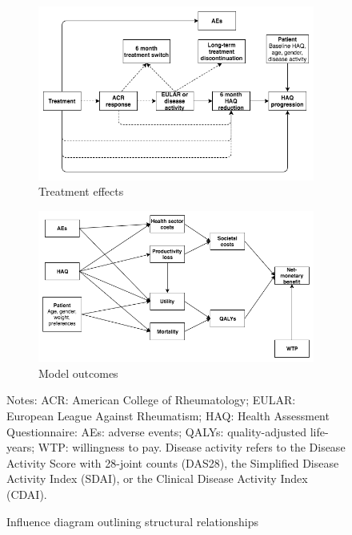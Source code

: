 \documentclass[11pt,final,fleqn]{article}\usepackage[]{graphicx}\usepackage[]{color}
\theoremstyle{plain}
\begin{document}
\begin{figure}
\centering
\begin{subfigure}{\textwidth}
\includegraphics[width=\textwidth]{influence-diagram-a.png}
\caption{Treatment effects} \label{subfig:treatment-effects}
\end{subfigure}
\begin{subfigure}{\textwidth}
\includegraphics[width=\textwidth]{influence-diagram-b.png}
\caption{Model outcomes} \label{subfig:model-outcomes}
\end{subfigure}
\caption{Influence diagram outlining structural relationships}\label{fig:influence-diagram}
\begin{minipage}{\linewidth}
\footnotesize
Notes: ACR: American College of Rheumatology; EULAR: European League Against Rheumatism; HAQ: Health Assessment Questionnaire: AEs: adverse events; QALYs: quality-adjusted life-years; WTP: willingness to pay. Disease activity refers to the Disease Activity Score with 28-joint counts (DAS28), the Simplified Disease Activity Index (SDAI), or the Clinical Disease Activity Index (CDAI).
\end{minipage}
\end{figure}
\end{document}
